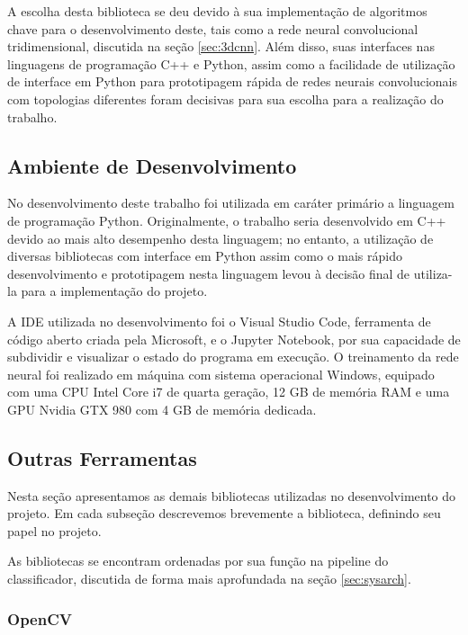 A escolha desta biblioteca se deu devido à sua implementação de algoritmos chave para o desenvolvimento deste, tais como a rede neural convolucional tridimensional, discutida na seção \ref{sec:3dcnn}. Além disso, suas interfaces nas linguagens de programação C++ e Python, assim como a facilidade de utilização de interface em Python para prototipagem rápida de redes neurais convolucionais com topologias diferentes foram decisivas para sua escolha para a realização do trabalho.

\subsection{Ambiente de Desenvolvimento}
\label{subsec:environ}

No desenvolvimento deste trabalho foi utilizada em caráter primário a linguagem de programação Python. Originalmente, o trabalho seria desenvolvido em C++ devido ao mais alto desempenho desta linguagem; no entanto, a utilização de diversas bibliotecas com interface em Python assim como o mais rápido desenvolvimento e prototipagem nesta linguagem levou à decisão final de utiliza-la para a implementação do projeto.

A IDE utilizada no desenvolvimento foi o Visual Studio Code, ferramenta de código aberto criada pela Microsoft, e o Jupyter Notebook\cite{Kluyver:2016aa}, por sua capacidade de subdividir e visualizar o estado do programa em execução. O treinamento da rede neural foi realizado em máquina com sistema operacional Windows, equipado com uma CPU Intel Core i7 de quarta geração, 12 GB de memória RAM e uma GPU Nvidia GTX 980 com 4 GB de memória dedicada.

\subsection{Outras Ferramentas}
\label{subsec:otools}

Nesta seção apresentamos as demais bibliotecas utilizadas no desenvolvimento do projeto. Em cada subseção descrevemos brevemente a biblioteca, definindo seu papel no projeto.

As bibliotecas se encontram ordenadas por sua função na pipeline do classificador, discutida de forma mais aprofundada na seção \ref{sec:sysarch}.

\subsubsection{OpenCV}

